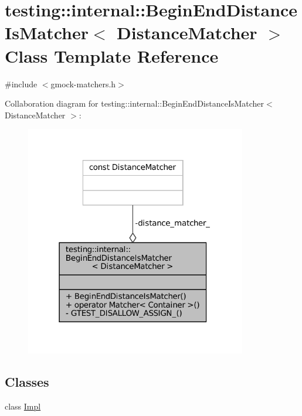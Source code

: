 \hypertarget{classtesting_1_1internal_1_1BeginEndDistanceIsMatcher}{}\section{testing\+:\+:internal\+:\+:Begin\+End\+Distance\+Is\+Matcher$<$ Distance\+Matcher $>$ Class Template Reference}
\label{classtesting_1_1internal_1_1BeginEndDistanceIsMatcher}


{\ttfamily \#include $<$gmock-\/matchers.\+h$>$}



Collaboration diagram for testing\+:\+:internal\+:\+:Begin\+End\+Distance\+Is\+Matcher$<$ Distance\+Matcher $>$\+:
\nopagebreak
\begin{figure}[H]
\begin{center}
\leavevmode
\includegraphics[width=274pt]{classtesting_1_1internal_1_1BeginEndDistanceIsMatcher__coll__graph}
\end{center}
\end{figure}
\subsection*{Classes}
\begin{DoxyCompactItemize}
\item 
class \hyperlink{classtesting_1_1internal_1_1BeginEndDistanceIsMatcher_1_1Impl}{Impl}
\end{DoxyCompactItemize}
